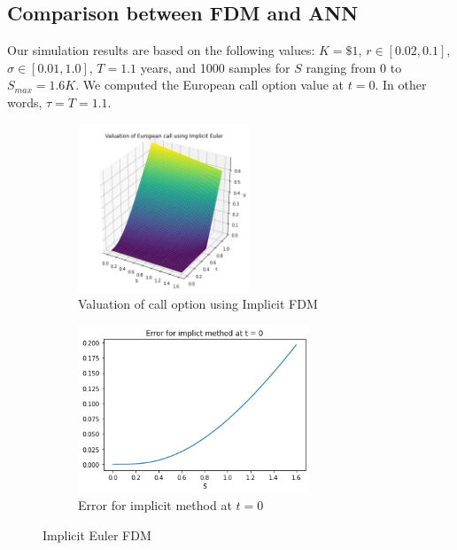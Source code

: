 \documentclass[12pt,a4paper]{article}
\begin{document}
\subsection{Comparison between FDM and ANN}

Our simulation results are based on the following values:
$K= \$1$, $r \in [0.02, 0.1]$, $\sigma \in [0.01, 1.0]$, $T = 1.1$ years, and 1000 samples for $S$ ranging from $0$ to $S_{max} = 1.6K.$ We computed the European call option value at $t= 0.$ In other words, $\tau = T= 1.1.$

\begin{figure}[H]
\begin{subfigure}{0.5\textwidth}
\includegraphics[width=0.9\linewidth, height=5cm]{implicit_FDM_option_value.png} 
\caption{Valuation of call option using Implicit FDM}
\label{fig:subim1 implicit sol}
\end{subfigure}
\begin{subfigure}{0.5\textwidth}
\includegraphics[width=0.9\linewidth, height=5cm]{implicit_FDM_error.png}
\caption{Error for implicit method at $t = 0$}
\label{fig:subim2 implicit err}
\end{subfigure}

\caption{Implicit Euler FDM}
\label{fig:implicit scheme}
\end{figure}
\end{document}

